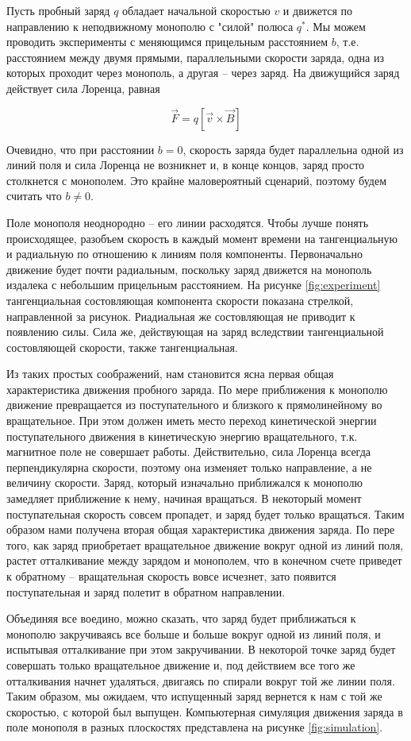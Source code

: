 \documentclass[a4paper, 12pt]{article}
\begin{document}
Пусть пробный заряд $q$ обладает начальной скоростью $v$ и движется по направлению к неподвижному монополю с "силой" полюса $q^*$. Мы можем проводить эксперименты с меняющимся прицельным расстоянием $b$, т.е. расстоянием между двумя прямыми, параллельными скорости заряда, одна из которых проходит через монополь, а другая -- через заряд. На движущийся заряд действует сила Лоренца, равная

\[
    \vec{F} = q\left[\vec{v}\times\vec{B}\right]
\]

Очевидно, что при расстоянии $b = 0$, скорость заряда будет параллельна одной из линий поля и сила Лоренца не возникнет и, в конце концов, заряд просто столкнется с монополем. Это крайне маловероятный сценарий, поэтому будем считать что $b \neq 0$. 

Поле монополя неоднородно -- его линии расходятся. Чтобы лучше понять происходящее, разобъем скорость в каждый момент времени на тангенциальную и радиальную по отношению к линиям поля компоненты. Первоначально движение будет почти радиальным, поскольку заряд движется на монополь издалека с небольшим прицельным расстоянием. На рисунке \ref{fig:experiment} тангенциальная состовляющая компонента скорости показана стрелкой, направленной за рисунок. Риадиальная же состовляющая не приводит к появлению силы. Сила же, действующая на заряд вследствии тангенциальной состовляющей скорости, также тангенциальная. 

Из таких простых соображений, нам становится ясна первая общая характеристика движения пробного заряда. По мере приближения к монополю движение превращается из поступательного и близкого к прямолинейному во вращательное. При этом должен иметь место переход кинетической энергии поступательного движения в кинетическую энергию вращательного, т.к. магнитное поле не совершает работы. Действительно, сила Лоренца всегда перпендикулярна скорости, поэтому она изменяет только направление, а не величину скорости. Заряд, который изначально приближался к монополю замедляет приближение к нему, начиная вращаться. В некоторый момент поступательная скорость совсем пропадет, и заряд будет только вращаться. Таким образом нами получена вторая общая характеристика движения заряда. По пере того, как заряд приобретает вращательное движение вокруг одной из линий поля, растет отталкивание между зарядом и монополем, что в конечном счете приведет к обратному -- вращательная скорость вовсе исчезнет, зато появится поступательная и заряд полетит в обратном направлении. 

Объединяя все воедино, можно сказать, что заряд будет приближаться к монополю закручиваясь все больше и больше вокруг одной из линий поля, и испытывая отталкивание при этом закручивании. В некоторой точке заряд будет совершать только вращательное движение и, под действием все того же отталкивания начнет удаляться, двигаясь по спирали вокруг той же линии поля. Таким образом, мы ожидаем, что испущенный заряд вернется к нам с той же скоростью, с которой был выпущен. Компьютерная симуляция движения заряда в поле монополя в разных плоскостях представлена на рисунке \ref{fig:simulation}.
\end{document}
